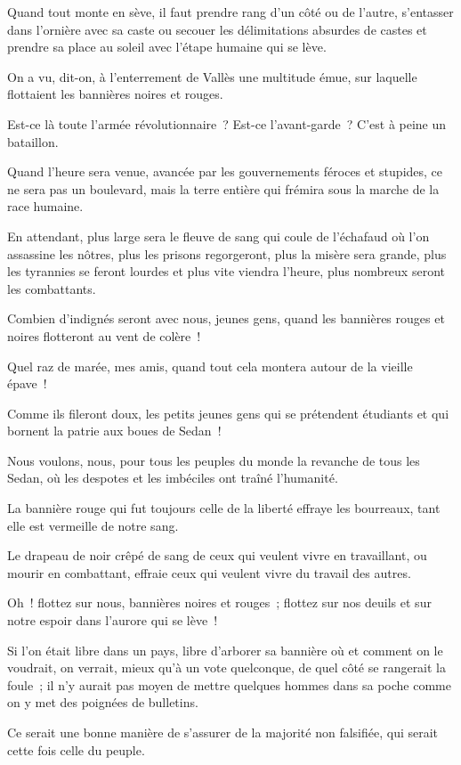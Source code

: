 \documentclass[french,twoside]{book} %
\begin{document}
Quand tout monte en sève, il faut prendre rang d’un côté ou de l’autre, s’entasser dans l’ornière avec sa caste ou secouer les délimitations absurdes de castes et prendre sa place au soleil avec l’étape humaine qui se lève.\par
On a vu, dit-on, à l’enterrement de Vallès une multitude émue, sur laquelle flottaient les bannières noires et rouges.\par
Est-ce là toute l’armée révolutionnaire ? Est-ce l’avant-garde ? C’est à peine un bataillon.\par
Quand l’heure sera venue, avancée par les gouvernements féroces et stupides, ce ne sera pas un boulevard, mais la terre entière qui frémira sous la marche de la race humaine.\par
En attendant, plus large sera le fleuve de sang qui coule de l’échafaud où l’on assassine les nôtres, plus les prisons regorgeront, plus la misère sera grande, plus les tyrannies se feront lourdes et plus vite viendra l’heure, plus nombreux seront les combattants.\par
Combien d’indignés seront avec nous, jeunes gens, quand les bannières rouges et noires flotteront au vent de colère !\par
Quel raz de marée, mes amis, quand tout cela montera autour de la vieille épave !\par
 Comme ils fileront doux, les petits jeunes gens qui se prétendent étudiants et qui bornent la patrie aux boues de Sedan !\par
Nous voulons, nous, pour tous les peuples du monde la revanche de tous les Sedan, où les despotes et les imbéciles ont traîné l’humanité.\par
La bannière rouge qui fut toujours celle de la liberté effraye les bourreaux, tant elle est vermeille de notre sang.\par
Le drapeau de noir crêpé de sang de ceux qui veulent vivre en travaillant, ou mourir en combattant, effraie ceux qui veulent vivre du travail des autres.\par
Oh ! flottez sur nous, bannières noires et rouges ; flottez sur nos deuils et sur notre espoir dans l’aurore qui se lève !\par
Si l’on était libre dans un pays, libre d’arborer sa bannière où et comment on le voudrait, on verrait, mieux qu’à un vote quelconque, de quel côté se rangerait la foule ; il n’y aurait pas moyen de mettre quelques hommes dans sa poche comme on y met des poignées de bulletins.\par
Ce serait une bonne manière de s’assurer de la majorité non falsifiée, qui serait cette fois celle du peuple.\par
\end{document}
